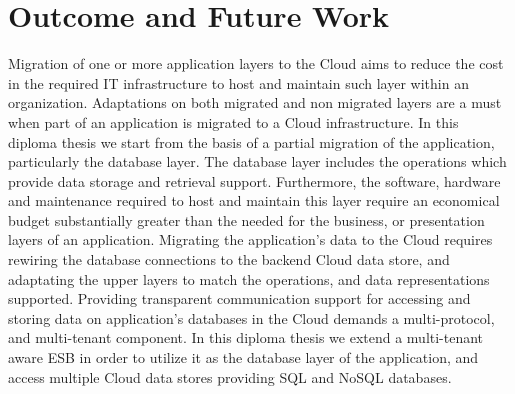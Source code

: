 \chapter{Outcome and Future Work}
\label{chap:outcome}

Migration of one or more application layers to the Cloud aims to reduce the cost in the required IT infrastructure to host and maintain such layer within an organization. Adaptations on both migrated and non migrated layers are a must when part of an application is migrated to a Cloud infrastructure. In this diploma thesis we start from the basis of a partial migration of the application, particularly the database layer. The database layer includes the operations which provide data storage and retrieval support. Furthermore, the software, hardware and maintenance required to host and maintain this layer require an economical budget substantially greater than the needed for the business, or presentation layers of an application. Migrating the application's data to the Cloud requires rewiring the database connections to the backend Cloud data store, and adaptating the upper layers to match the operations, and data representations supported. Providing transparent communication support for accessing and storing data on application's databases in the Cloud demands a multi-protocol, and multi-tenant component. In this diploma thesis we extend a multi-tenant aware \ac{ESB} in order to utilize it as the database layer of the application, and access multiple Cloud data stores providing \ac{SQL} and \ac{NoSQL} databases. 

